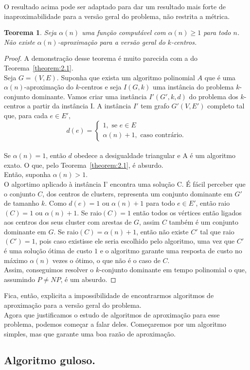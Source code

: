 \documentclass[12pt]{article}
\newtheorem{theorem}{Teorema}[section]
\newcommand{\NP}{\mathit{NP}}
\begin{document}
O resultado acima pode ser adaptado para dar um resultado mais forte de inaproximabilidade para a versão geral do problema, não restrita a métrica.
\begin{theorem}
    Seja $\alpha(n)$ uma função computável com $\alpha(n)\geq 1$ para todo $n$. Não existe $\alpha(n)$-aproximação para a versão geral do $k$-centros.
\end{theorem}

\begin{proof}
        A demonstração desse teorema é muito parecida com a do Teorema~\ref{theorem:2.1}. \\
        Seja $G = (V,E)$. Suponha que exista um algoritmo polinomial $A$ que é uma $\alpha(n)$-aproximação do $k$-centros e seja $I(G,k)$ uma instância do problema $k$-conjunto dominante. Vamos criar uma instância $I'(G',k,d)$ do problema dos $k$-centros a partir da instância I. A instância $I'$ tem grafo $G'(V,E')$ completo tal que, para cada $e \in E'$, \\
    \[d(e) = \begin{cases}
            1, \text{ se } e \in E \\
            \alpha(n)+1, \text{ caso contrário.} 
            \end{cases}\]\\
    Se $\alpha(n)=1$, então $d$ obedece a desigualdade triangular e A é um algoritmo exato. O que, pelo Teorema~\ref{theorem:2.1}, é absurdo. \\
    Então, suponha $\alpha(n)>1$. \\
    O algortimo aplicado à instância I' encontra uma solução C. É fácil perceber que o conjunto $C$, dos centros de clusters, representa um conjunto dominante em $G'$ de tamanho $k$. Como $d(e) = 1$ ou $\alpha(n)+1$ para todo $e \in E'$, então raio$(C)=1$ ou $\alpha(n)+1$. Se raio$(C)=1$ então todos os vértices então ligados aos centros dos seus cluster com arestas de $G$, assim $C$ também é um conjunto dominante em $G$. Se raio$(C) = \alpha(n) + 1$, então não existe $C'$ tal que raio$(C')=1$, pois caso existisse ele seria escolhido pelo algoritmo, uma vez que $C'$ é uma solução ótima de custo $1$ e o algoritmo garante uma resposta de custo no máximo $\alpha(n)$ vezes o ótimo, o que não é o caso de $C$. \\
    Assim, conseguimos resolver o $k$-conjunto dominante em tempo polinomial o que, assumindo $P \not= \NP$, é um absurdo.
\end{proof}
    Fica, então, explicita a impossibilidade de encontrarmos algoritmos de aproximação para a versão geral do problema. \\
    Agora que justificamos o estudo de algoritmos de aproximação para esse problema, podemos começar a falar deles. Começaremos por um algoritmo simples, mas que garante uma boa razão de aproximação.
    
\subsection{Algoritmo guloso.}
    
\newpage


\end{document}
